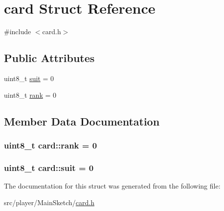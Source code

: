 \hypertarget{structcard}{\section{card Struct Reference}
\label{structcard}
}


{\ttfamily \#include $<$card.\-h$>$}

\subsection*{Public Attributes}
\begin{DoxyCompactItemize}
\item 
uint8\-\_\-t \hyperlink{structcard_aa35da0a3d5e08fba8f56c5561e5dbcc7}{suit} = 0
\item 
uint8\-\_\-t \hyperlink{structcard_a418a8e9645d35c241b0740bac81c2d7a}{rank} = 0
\end{DoxyCompactItemize}


\subsection{Member Data Documentation}
\hypertarget{structcard_a418a8e9645d35c241b0740bac81c2d7a}{
\subsubsection[{rank}]{\setlength{\rightskip}{0pt plus 5cm}uint8\-\_\-t card\-::rank = 0}}\label{structcard_a418a8e9645d35c241b0740bac81c2d7a}
\hypertarget{structcard_aa35da0a3d5e08fba8f56c5561e5dbcc7}{
\subsubsection[{suit}]{\setlength{\rightskip}{0pt plus 5cm}uint8\-\_\-t card\-::suit = 0}}\label{structcard_aa35da0a3d5e08fba8f56c5561e5dbcc7}


The documentation for this struct was generated from the following file\-:\begin{DoxyCompactItemize}
\item 
src/player/\-Main\-Sketch/\hyperlink{src_2player_2MainSketch_2card_8h}{card.\-h}\end{DoxyCompactItemize}
